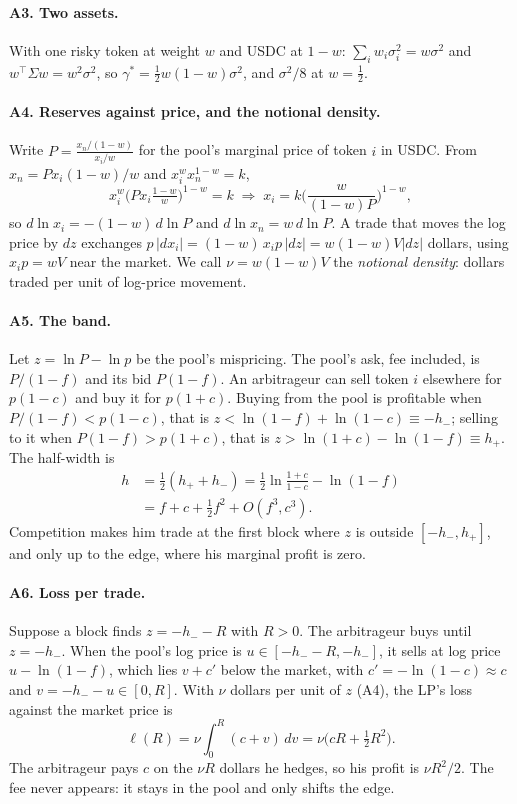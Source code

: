 \paragraph{A3. Two assets.} With one risky token at weight $w$ and USDC at $1-w$: $\sum_iw_i\sigma_i^2=w\sigma^2$ and $w^{\top}\Sigma w=w^2\sigma^2$, so $\gamma^{*}=\tfrac12w(1-w)\sigma^2$, and $\sigma^2/8$ at $w=\tfrac12$.

\paragraph{A4. Reserves against price, and the notional density.} Write $P=\frac{x_n/(1-w)}{x_i/w}$ for the pool's marginal price of token $i$ in USDC. From $x_n=Px_i(1-w)/w$ and $x_i^{w}x_n^{1-w}=k$,
\begin{equation}
x_i^{w}\Big(Px_i\tfrac{1-w}{w}\Big)^{1-w}=k\;\Rightarrow\;x_i=k\Big(\frac{w}{(1-w)P}\Big)^{1-w},
\end{equation}
so $d\ln x_i=-(1-w)\,d\ln P$ and $d\ln x_n=w\,d\ln P$. A trade that moves the log price by $dz$ exchanges $p\,|dx_i|=(1-w)\,x_ip\,|dz|=w(1-w)V|dz|$ dollars, using $x_ip=wV$ near the market. We call $\nu=w(1-w)V$ the \emph{notional density}: dollars traded per unit of log-price movement.

\paragraph{A5. The band.} Let $z=\ln P-\ln p$ be the pool's mispricing. The pool's ask, fee included, is $P/(1-f)$ and its bid $P(1-f)$. An arbitrageur can sell token $i$ elsewhere for $p(1-c)$ and buy it for $p(1+c)$. Buying from the pool is profitable when $P/(1-f)<p(1-c)$, that is $z<\ln(1-f)+\ln(1-c)\equiv-h_-$; selling to it when $P(1-f)>p(1+c)$, that is $z>\ln(1+c)-\ln(1-f)\equiv h_+$. The half-width is
\begin{equation}
\begin{aligned}
h&=\tfrac12(h_++h_-)=\tfrac12\ln\frac{1+c}{1-c}-\ln(1-f)\\
&=f+c+\tfrac12f^2+O(f^3,c^3).
\end{aligned}
\end{equation}
Competition makes him trade at the first block where $z$ is outside $[-h_-,h_+]$, and only up to the edge, where his marginal profit is zero.

\paragraph{A6. Loss per trade.} Suppose a block finds $z=-h_--R$ with $R>0$. The arbitrageur buys until $z=-h_-$. When the pool's log price is $u\in[-h_--R,-h_-]$, it sells at log price $u-\ln(1-f)$, which lies $v+c'$ below the market, with $c'=-\ln(1-c)\approx c$ and $v=-h_--u\in[0,R]$. With $\nu$ dollars per unit of $z$ (A4), the LP's loss against the market price is
\begin{equation}
\ell(R)=\nu\int_0^R(c+v)\,dv=\nu\big(cR+\tfrac12R^2\big).
\end{equation}
The arbitrageur pays $c$ on the $\nu R$ dollars he hedges, so his profit is $\nu R^2/2$. The fee never appears: it stays in the pool and only shifts the edge.

